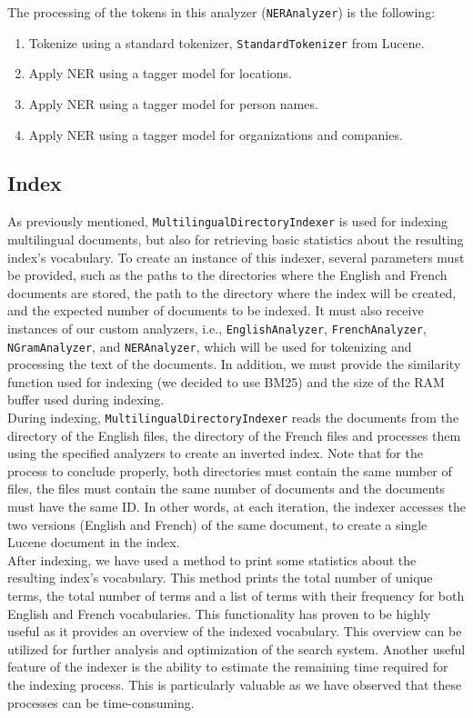 The processing of the tokens in this analyzer (\texttt{NERAnalyzer}) is the following:
\begin{enumerate}
    \item Tokenize using a standard tokenizer, \texttt{StandardTokenizer} from Lucene.
    \item Apply NER using a tagger model for locations.
    \item Apply NER using a tagger model for person names.
    \item Apply NER using a tagger model for organizations and companies.
\end{enumerate}

\subsection{Index}\label{subsec:index}

As previously mentioned, \texttt{MultilingualDirectoryIndexer} is used for indexing multilingual documents, but also for
retrieving basic statistics about the resulting index's vocabulary.
To create an instance of this indexer, several parameters must be provided, such as the paths to the directories where
the English and French documents are stored, the path to the directory where the index will be created, and the expected
number of documents to be indexed.
It must also receive instances of our custom analyzers, i.e., \texttt{EnglishAnalyzer}, \texttt{FrenchAnalyzer},
\texttt{NGramAnalyzer}, and \texttt{NERAnalyzer}, which will be used for tokenizing and processing the text of the
documents.
In addition, we must provide the similarity function used for indexing (we decided to use BM25) and the size of the RAM
buffer used during indexing.\\

During indexing, \texttt{MultilingualDirectoryIndexer} reads the documents from the directory of the English files, the
directory of the French files and processes them using the specified analyzers to create an inverted index.
Note that for the process to conclude properly, both directories must contain the same number of files, the files must
contain the same number of documents and the documents must have the same ID\@.
In other words, at each iteration, the indexer accesses the two versions (English and French) of the same document, to
create a single Lucene document in the index.\\

After indexing, we have used a method to print some statistics about the resulting index's vocabulary.
This method prints the total number of unique terms, the total number of terms and a list of terms with their frequency
for both English and French vocabularies.
This functionality has proven to be highly useful as it provides an overview of the indexed vocabulary.
This overview can be utilized for further analysis and optimization of the search system.
Another useful feature of the indexer is the ability to estimate the remaining time required for the indexing process.
This is particularly valuable as we have observed that these processes can be time-consuming.\\

